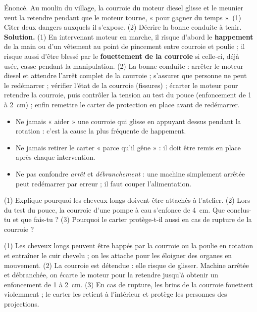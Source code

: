 \documentclass[11pt]{article}
\begin{document}
\begin{exoresolu}
Énoncé. Au moulin du village, la courroie du moteur diesel glisse et le meunier veut la retendre pendant que le moteur tourne, « pour gagner du temps ». (1) Citer deux dangers auxquels il s'expose. (2) Décrire la bonne conduite à tenir.
\tcblower
\textbf{Solution.} (1) En intervenant moteur en marche, il risque d'abord le \textbf{happement} de la main ou d'un vêtement au point de pincement entre courroie et poulie ; il risque aussi d'être blessé par le \textbf{fouettement de la courroie} si celle-ci, déjà usée, casse pendant la manipulation. (2) La bonne conduite : arrêter le moteur diesel et attendre l'arrêt complet de la courroie ; s'assurer que personne ne peut le redémarrer ; vérifier l'état de la courroie (fissures) ; écarter le moteur pour retendre la courroie, puis contrôler la tension au test du pouce (enfoncement de 1 à \SI{2}{cm}) ; enfin remettre le carter de protection en place avant de redémarrer.
\end{exoresolu}

\begin{attention}
\begin{itemize}
\item Ne jamais « aider » une courroie qui glisse en appuyant dessus pendant la rotation : c'est la cause la plus fréquente de happement.
\item Ne jamais retirer le carter « parce qu'il gêne » : il doit être remis en place après chaque intervention.
\item Ne pas confondre \emph{arrêt} et \emph{débranchement} : une machine simplement arrêtée peut redémarrer par erreur ; il faut couper l'alimentation.
\end{itemize}
\end{attention}

\begin{exercice}
(1) Explique pourquoi les cheveux longs doivent être attachés à l'atelier. (2) Lors du test du pouce, la courroie d'une pompe à eau s'enfonce de \SI{4}{cm}. Que conclus-tu et que fais-tu ? (3) Pourquoi le carter protège-t-il aussi en cas de rupture de la courroie ?
\end{exercice}

\begin{corrige}[Exercice]
(1) Les cheveux longs peuvent être happés par la courroie ou la poulie en rotation et entraîner le cuir chevelu ; on les attache pour les éloigner des organes en mouvement. (2) La courroie est détendue : elle risque de glisser. Machine arrêtée et débranchée, on écarte le moteur pour la retendre jusqu'à obtenir un enfoncement de 1 à \SI{2}{cm}. (3) En cas de rupture, les brins de la courroie fouettent violemment ; le carter les retient à l'intérieur et protège les personnes des projections.
\end{corrige}
\end{document}
